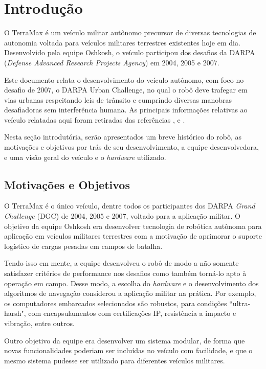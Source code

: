 \section{Introdução}

O TerraMax é um veículo militar autônomo precursor de diversas tecnologias de autonomia voltada para veículos militares terrestres existentes hoje em dia. Desenvolvido pela equipe Oshkosh, o veículo participou dos desafios da DARPA (\emph{Defense Advanced Research Projects Agency}) em 2004, 2005 e 2007.

Este documento relata o desenvolvimento do veículo autônomo, com foco no desafio de 2007, o DARPA Urban Challenge, no qual o robô deve trafegar em vias urbanas respeitando leis de trânsito e cumprindo diversas manobras desafiadoras sem interferência humana. As principais informações relativas ao veículo relatadas aqui foram retiradas das referências \cite{chen2009terramax}, \cite{braid2006terramax} e \cite{broggi2008passive}.

Nesta seção introdutória, serão apresentados um breve histórico do robô, as motivações e objetivos por trás de seu desenvolvimento, a equipe desenvolvedora, e uma visão geral do veículo e o \emph{hardware} utilizado.

\subsection{Motivações e Objetivos}

O TerraMax é o único veículo, dentre todos os participantes dos DARPA \emph{Grand Challenge} (DGC) de 2004, 2005 e 2007, voltado para a aplicação militar. O objetivo da equipe Oshkosh era desenvolver tecnologia de robótica autônoma para aplicação em veículos militares terrestres com a motivação de aprimorar o suporte logístico de cargas pesadas em campos de batalha.

Tendo isso em mente, a equipe desenvolveu o robô de modo a não somente satisfazer critérios de performance nos desafios como também torná-lo apto à operação em campo. Desse modo, a escolha do \emph{hardware} e o desenvolvimento dos algoritmos de navegação considerou a aplicação militar na prática. Por exemplo, os computadores embarcados selecionados são robustos, para condições ``ultra-harsh", com encapsulamentos com certificações IP, resistência a impacto e vibração, entre outros.

Outro objetivo da equipe era desenvolver um sistema modular, de forma que novas funcionalidades poderiam ser incluídas no veículo com facilidade, e que o mesmo sistema pudesse ser utilizado para diferentes veículos militares.

